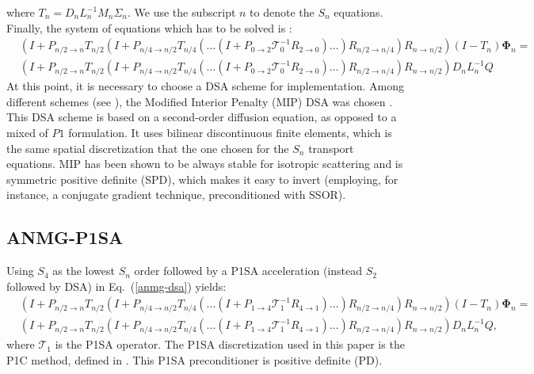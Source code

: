 \documentclass[preprint,10pt]{elsarticle}
\newcommand\bs{\boldsymbol}
\renewcommand{\(}{\left(}
\renewcommand{\)}{\right)}
\renewcommand{\[}{\left[}
\renewcommand{\]}{\right]}
\newcommand{\eqt}[1]{Eq.~(\ref{#1})}                     %
\begin{document}
%
where $T_n = D_n L_n^{-1}M_n \Sigma_n$. We use the subscript $n$ to denote 
the $S_n$ equations.\\
Finally, the system of equations which has to be solved is :
\begin{equation}
\begin{split}
&(I+P_{{n}/{2}\rightarrow n }
T_{{n}/{2}} (I+P_{{n}/{4}\rightarrow {n}/{2}}T_{{n}/{4}} (\hdots
(I+P_{0\rightarrow 2} \mathcal{T}_0^{-1} R_{2\rightarrow 0})\hdots)
R_{{n}/{2}\rightarrow {n}/{4}})R_{n\rightarrow{n}/{2}})(I-T_n)
\bs{\Phi}_n =\\
& (I+P_{{n}/{2}\rightarrow n} T_{{n}/{2}} (I+P_{{n}/{4}
\rightarrow {n}/{2}} T_{{n}/{4}} (\hdots (I+P_{0 \rightarrow
2}\mathcal{T}_0^{-1} R_{2\rightarrow 0})\hdots)R_{{n}/{2}\rightarrow
{n}/{4}})R_{n\rightarrow {n}/{2}} ) D_n L_n^{-1} Q
\end{split}
\label{anmg-dsa}
\end{equation}  
%
At this point, it is necessary to choose a DSA scheme for implementation. Among different
schemes (see \cite{adams}), the Modified Interior Penalty (MIP) DSA was
chosen \cite{mip}. This DSA scheme is based on a second-order diffusion equation, 
as opposed to a mixed of $P1$ formulation.
It uses bilinear discontinuous finite elements, which is
the same spatial discretization that the one chosen for the
$S_n$ transport equations. MIP has been shown to be always stable for isotropic
scattering and is symmetric positive definite (SPD), which makes it easy to invert
(employing, for instance, a conjugate gradient technique, preconditioned with SSOR).

\subsection{ANMG-P1SA}

Using $S_4$ as the lowest $S_n$ order followed by a P1SA acceleration (instead $S_2$ followed by DSA) in 
\eqt{anmg-dsa} yields:
%
\begin{equation}
\begin{split}
& (I+P_{n/2\rightarrow n} T_{n/2} (I+P_{n/4\rightarrow n/2}
T_{n/4}(\hdots(I+P_{1\rightarrow 4}\mathcal{T}_1^{-1} R_{4\rightarrow
1})\hdots)R_{n/2 \rightarrow n/4})R_{n\rightarrow n/2}) (I-T_n)\bs{\Phi}_n = \\
& (I+P_{n/2\rightarrow n} T_{n/2} (I+P_{n/4\rightarrow n/2}
T_{n/4}(\hdots(I+P_{1\rightarrow 4}\mathcal{T}_1^{-1} R_{4\rightarrow
1})\hdots)R_{n/2\rightarrow n/4})R_{n\rightarrow n/2}) D_n L_n^{-1} Q ,
\end{split}
\end{equation}
%
where $\mathcal{T}_1$ is the P1SA operator. 
The P1SA discretization used in this paper is the P1C method, defined in \cite{yaqi}. 
This P1SA preconditioner is positive definite (PD).
\end{document}

